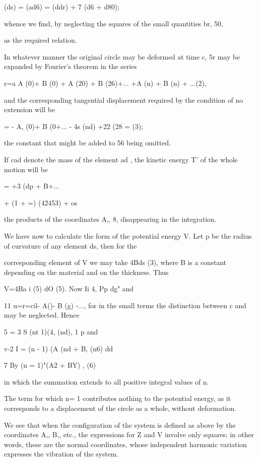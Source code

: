 (ds) = (ad6) = (ddr) + 7 (d6 + d80);

whence we find, by neglecting the squares of the small quantities br,
50,

as the required relation.

In whatever manner the original circle may be deformed at time c, 5r may
be expanded by Fourier's theorem in the series

r=a A (0)+ B (0) + A (20) + B (26)+... +A (n) + B (n) + ...(2),

and the corresponding tangential displacement required by the condition
of no extension will be

= - A, (0)+ B (0+... - 4s (nd) +22 (28 = (3);

the constant that might be added to 56 being omitted.

If cad denote the mass of the element ad , the kinetic energy T' of the
whole motion will be

= +3 (dp + B+...

+ (1 + =) (42453) + os

the products of the coordinates A,, 8, disappearing in the integration.

We have now to calculate the form of the potential energy V. Let p be
the radius of curvature of any element ds, then for the

corresponding element of V we may take 4Bds (3), where B is a
constant depending on the material and on the thickness. Thus

V=4Ba i (5) dO (5). Now Ii 4, Pp dg" and

11 u=r=cil- A()- B (g) -..., for in the small terms the distinction
between c and may be neglected. Hence

5 = 3 S (nt 1)(4, (nd), 1 p and

v-2 I = (n - 1) (A (nd + B, (n6) dd

7 By (n = 1)"(A2 + BY) , (6)

in which the summation extends to all positive integral values of n.

The term for which n= 1 contributes nothing to the potential energy, as
it corresponds to a displacement of the circle as a whole, without
deformation.

We see that when the configuration of the system is defined as above by
the coordinates A,, B,, etc., the expressions for Z and V involve only
squares; in other words, these are the normal coordinates, whose
independent harmonic variation expresses the vibration of the system.

